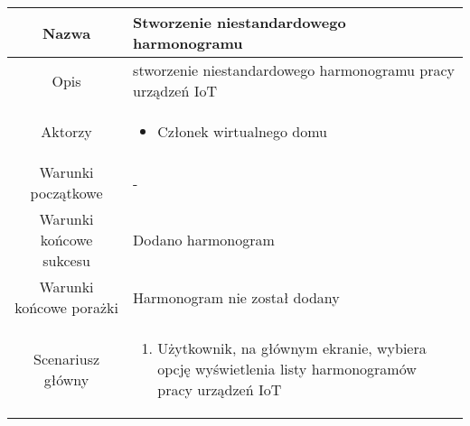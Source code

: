 \documentclass{article}
\begin{document}
\begin{enumerate}
\begin{enumerate}
				\begin{table}[H]
					\centering
					\begin{tabular}{|c|p{7cm}|}
						\hline
						Nazwa                   & \textbf{Stworzenie niestandardowego harmonogramu}                                                                                                                                                                                                                                                                                                    \\
						\hline
						Opis                    & stworzenie niestandardowego harmonogramu pracy urządzeń IoT                                                                                                                                                                                                                                                                                          \\
						\hline
						Aktorzy                 & \begin{itemize}\item Członek wirtualnego domu\end{itemize}                                                                                                                                                                                                                                                                                           \\
						\hline
						Warunki początkowe      & -                                                                                                                                                                                                                                                                                                                                                    \\
						\hline
						Warunki końcowe sukcesu & Dodano harmonogram                                                                                                                                                                                                                                                                                                                                   \\
						\hline
						Warunki końcowe porażki & Harmonogram nie został dodany                                                                                                                                                                                                                                                                                                                        \\
						\hline
						Scenariusz główny       & \begin{enumerate}\item Użytkownik, na głównym ekranie, wybiera opcję wyświetlenia listy harmonogramów pracy urządzeń IoT


\end{enumerate}
\end{tabular}
\end{table}
\end{enumerate}
\end{enumerate}
\end{document}
